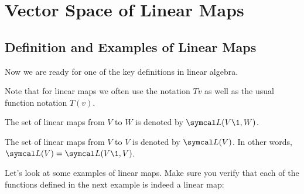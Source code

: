 
\section{Vector Space of Linear Maps} \label{vslinear}

\subsection{Definition and Examples of Linear Maps}

Now we are ready for one of the key definitions in linear algebra.



Note that for linear maps we often use the notation $Tv$ as well as the usual function notation $T(v)$.

\bigskip

{\begin{Itemize}
\item
The set of linear maps from $V$ to $W$ is denoted by $\L(V\1,W)$.
\item
The set of linear maps from $V$ to $V$ is denoted by $\L(V)$. In other words, $\L(V) = \L(V\1,V)$.
\end{Itemize}
}

Let's look at some examples of linear maps.  Make sure you verify that each of
the functions defined in the next example is indeed a linear map:

